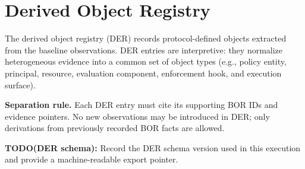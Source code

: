 \section{Derived Object Registry}
\label{sec:der}
The derived object registry (DER) records protocol-defined objects extracted from the baseline observations. DER entries are interpretive: they normalize heterogeneous evidence into a common set of object types (e.g., policy entity, principal, resource, evaluation component, enforcement hook, and execution surface).

\textbf{Separation rule.} Each DER entry must cite its supporting BOR IDs and evidence pointers. No new observations may be introduced in DER; only derivations from previously recorded BOR facts are allowed.

\textbf{TODO(DER schema):} Record the DER schema version used in this execution and provide a machine-readable export pointer.

